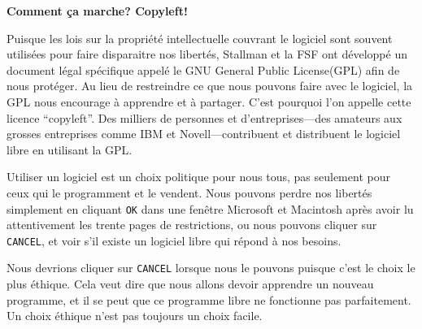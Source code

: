 \documentclass[12pt]{article}
\begin{document}

\begin{center}
{\Large\bf Comment ça marche? Copyleft!}
\end{center}

Puisque les lois sur la propriété intellectuelle couvrant le logiciel sont
souvent utilisées pour faire disparaitre nos libertés, Stallman et la FSF ont
développé un document légal spécifique appelé le GNU General Public
License(GPL) afin de nous protéger. Au lieu de restreindre ce que nous pouvons
faire avec le logiciel, la GPL nous encourage à apprendre et à partager. C'est
pourquoi l'on appelle cette licence ``copyleft''. Des milliers de personnes et
d'entreprises---des amateurs aux grosses entreprises comme IBM et
Novell---contribuent et distribuent le logiciel libre en utilisant la GPL.


Utiliser un logiciel est un choix politique pour nous tous, pas seulement pour
ceux qui le programment et le vendent. Nous pouvons perdre nos libertés
simplement en cliquant {\tt OK} dans une fenêtre Microsoft et Macintosh après
avoir lu attentivement les trente pages de restrictions, ou nous pouvons
cliquer sur {\tt CANCEL}, et voir s'il existe un logiciel libre qui répond à
nos besoins.


Nous devrions cliquer sur {\tt CANCEL} lorsque nous le pouvons puisque c'est le
choix le plus éthique. Cela veut dire que nous allons devoir apprendre un
nouveau programme, et il se peut que ce programme libre ne fonctionne pas
parfaitement. Un choix éthique n'est pas toujours un choix facile.
\end{document}
